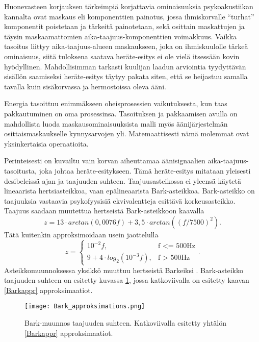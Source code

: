 \documentclass[finnish,12pt]{article}
\def\excitation_representation{heräte-esitys}
\def\to_excitation_representation{heräte-esitykseen}
\begin{document}
Huonevasteen korjauksen tärkeimpiä korjattavia ominaisuuksia psykoakustiikan kannalta ovat maskaus eli komponenttien painotus, jossa ihmiskorvalle ``turhat'' komponentit poistetaan ja tärkeitä painotetaan, sekä osittain maskattujen ja täysin maskaamattomien aika-taajuus-komponenttien voimakkuus. Vaikka tasoitus liittyy aika-taajuus-alueen maskaukseen, joka on ihmiskuulolle tärkeä ominaisuus, siitä tuloksena saatava \excitation_representation ei ole vielä itsessään kovin hyödyllinen. Mahdollisimman tarkasti kuulijan laadun arviointia tyydyttävän sisällön saamiseksi \excitation_representation täytyy pakata siten, että se heijastuu samalla tavalla kuin sisäkorvassa ja hermostoissa oleva ääni. \cite[luku 1.4]{Kahrs2002}

Energia tasoittuu enimmäkseen oheisprosessien vaikutuksesta, kun taas pakkautuminen on oma prosessinsa. Tasoituksen ja pakkaamisen avulla on mahdollista luoda maskausominaisuuksista malli myös äänijärjestelmän osittaismaskaukselle kynnysarvojen yli. Matemaattisesti nämä molemmat ovat yksinkertaisia operaatioita. \cite[luku 1.4]{Kahrs2002}

Perinteisesti on kuvailtu vain korvan aiheuttamaa äänisignaalien aika-taajuus-tasoitusta, joka johtaa \to_excitation_representation. Tämä \excitation_representation mitataan yleisesti desibeleissä ajan ja taajuuden suhteen. Taajuusasteikossa ei yleensä käytetä lineaarista hertsiasteikkoa, vaan epälineaarista Bark-asteikkoa. Bark-asteikko on taajuuksia vastaavia psykofyysisiä ekvivalentteja esittävä korkeusasteikko. Taajuus saadaan muutettua hertseistä Bark-asteikkoon kaavalla \begin{equation}
	\label{Bark}
	z = 13 \cdot arctan(0,0076f)+3,5 \cdot arctan((f/7500)^2).
\end{equation} Tätä kuitenkin approksimoidaan usein jaottelulla
\begin{equation}
	\label{Barkappr}
	z = \begin{cases}
		10^{-2} f,						& \mbox{f <= 500Hz} \\
		9 + 4 \cdot log_{2}(10^{-3}f),	& \mbox{f > 500Hz}
	\end{cases}.
\end{equation} Asteikkomuunnoksessa yksikkö muuttuu hertseistä Barkeiksi \cite{Fastl1997, Smith1999}. Bark-asteikko taajuuden suhteen on esitetty kuvassa \ref{fig:Bark_approksimations}, jossa katkoviivalla on esitetty kaavan \eqref{Barkappr} approksimaatiot.

\begin{figure}[h!]
\centering
\texttt{[image: Bark\_approksimations.png]}
\caption{Bark-muunnos taajuuden suhteen. Katkoviivalla esitetty yhtälön \eqref{Barkappr} approksimaatiot. \cite{Fastl1997}}
\label{fig:Bark_approksimations}
\end{figure}
\end{document}
